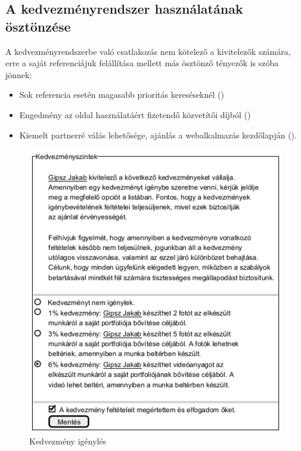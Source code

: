\subsection{A kedvezményrendszer használatának ösztönzése}
A kedvezményrendszerbe való csatlakozás nem kötelező a kivitelezők számára, erre a saját referenciájuk felállítása mellett más ösztönző tényezők is szóba jönnek:
\begin{itemize}
\item Sok referencia esetén magasabb prioritás kereséseknél ()
\item Engedmény az oldal használatáért fizetendő közvetítői díjból ()
\item Kiemelt partnerré válás lehetősége, ajánlás a webalkalmazás kezdőlapján ().
\end{itemize} 

\begin{figure}[h]
	\centering
	\includegraphics[scale=0.5]{img/kedvezmeny.png}
	\caption*{Kedvezmény igénylés}
	\label{fig:kedvez}
\end{figure}